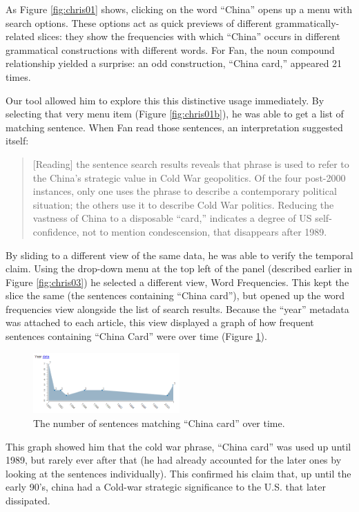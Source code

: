\documentclass{sig-alternate}
\begin{document}
As Figure \ref{fig:chris01} shows, clicking on the word ``China'' opens up a menu with search options. These options act as quick previews of different grammatically-related slices: they show the frequencies with which ``China'' occurs in different grammatical constructions with different words.  For Fan, the noun compound relationship yielded a surprise: an odd construction, ``China card,'' appeared 21 times.


Our tool allowed him to explore this this distinctive usage immediately. By selecting that very menu item (Figure \ref{fig:chris01b}), he was able to get a list of matching sentence. When Fan read those sentences, an interpretation suggested itself:
\begin{quote}[Reading] the sentence search results reveals that phrase is used to refer to the China's strategic value in Cold War geopolitics. Of the four post-2000 instances, only one uses the phrase to describe a contemporary political situation; the others use it to describe Cold War politics. Reducing the vastness of China to a disposable ``card,'' indicates a degree of US self-confidence, not to mention condescension, that disappears after 1989.\end{quote}
By sliding to a different view of the same data, he was able to verify the temporal claim. Using the drop-down menu at the top left of the panel (described earlier in Figure \ref{fig:chris03}) he selected a different view, Word Frequencies. This kept the slice the same (the sentences containing ``China card''), but opened up the word frequencies view alongside the list of search results.  Because the ``year'' metadata was attached to each article, this view displayed a graph of how frequent  sentences containing ``China Card'' were over time (Figure \ref{fig:chris02}). 

\begin{figure}[h!]
\includegraphics[width=0.5\textwidth]{fig/chris/02.png}
\caption{ The number of sentences matching ``China card'' over time. \label{fig:chris02}}
\end{figure}
This graph showed him that the cold war phrase, ``China card'' was used up until 1989, but rarely ever after that (he had already accounted for the later ones by looking at the sentences individually). This confirmed his claim that, up until the early 90's, china had a Cold-war strategic significance to the U.S. that later dissipated.
\end{document}
